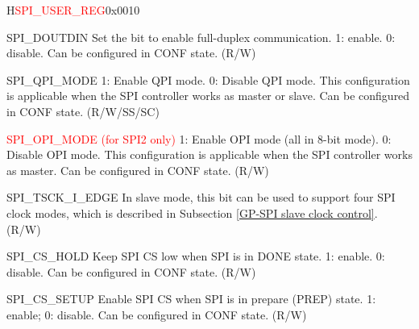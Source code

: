 \begin{register}{H}{\textcolor{red}{SPI\_USER\_REG}}{0x{}0010}\label{regdesc:SPIUSERREG}
%
%
%
%
%
%
%
%
%
%
%
%
%
%
%
%
%
%
%
%
%
%
%
%
%
\regnewline%
\begin{regdesc}\begin{reglist}
\label{fielddesc:SPIDOUTDIN}\item [SPI\_DOUTDIN] Set the bit to enable full-duplex communication. 1: enable. 0: disable. Can be configured in CONF state. (R/W)
\label{fielddesc:SPIQPIMODE}\item [SPI\_QPI\_MODE] 1: Enable QPI mode. 0: Disable QPI mode. This configuration is applicable when the SPI controller works as master or slave. Can be configured in CONF state. (R/W/SS/SC)
\label{fielddesc:SPIOPIMODE}\item [\textcolor{red}{SPI\_OPI\_MODE (for SPI2 only)}] 1: Enable OPI mode (all in 8-bit mode). 0: Disable OPI mode. This configuration is applicable when the SPI controller works as master. Can be configured in CONF state. (R/W)
\label{fielddesc:SPITSCKIEDGE}\item [SPI\_TSCK\_I\_EDGE] In slave mode, this bit can be used to support four SPI clock modes, which is described in Subsection \ref{GP-SPI slave clock control}.  (R/W)
\label{fielddesc:SPICSHOLD}\item [SPI\_CS\_HOLD] Keep SPI CS low when SPI is in DONE state. 1: enable. 0: disable. Can be configured in CONF state. (R/W)
\label{fielddesc:SPICSSETUP}\item [SPI\_CS\_SETUP] Enable SPI CS when SPI is in prepare (PREP) state. 1: enable; 0: disable. Can be configured in CONF state. (R/W)

\end{reglist}
\end{regdesc}
\end{register}
